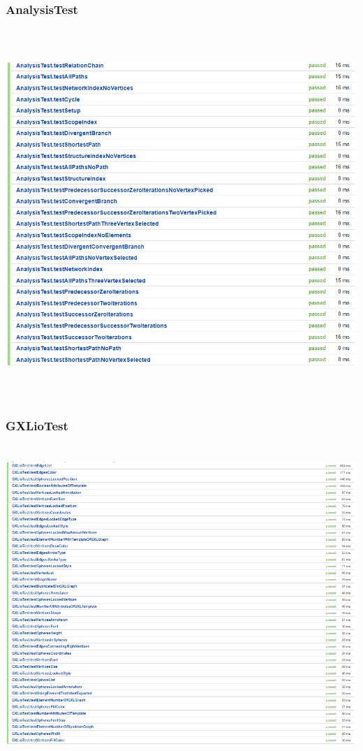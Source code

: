 \documentclass[enabledeprecatedfontcommands]{scrartcl}
\begin{document}
\subsubsection{AnalysisTest}
\begin{center}
\includegraphics[height=14cm]{result-analysistest.png}
\end{center}
\subsubsection{GXLioTest}
\begin{center}
\includegraphics[height=12cm]{result-gxliotest.png}
\end{center}
\end{document}

